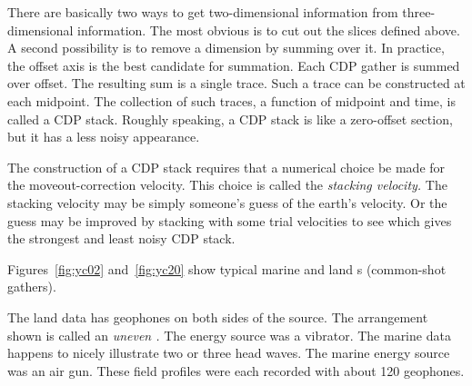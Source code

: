 \par
There are basically two ways to get two-dimensional information
from three-dimensional information.
The most obvious is to cut out the slices defined above.
A second possibility is to remove a dimension by summing over it.
In practice, the offset axis is the best candidate for summation.
Each CDP gather is summed over offset.
The resulting sum is a single trace.
Such a trace can be constructed at each midpoint.
The collection of such traces, a function of midpoint and time,
is called a CDP stack.
Roughly speaking, a CDP stack is like a zero-offset section,
but it has a less noisy appearance.
\par
The construction of a CDP stack requires that a numerical choice
be made for the moveout-correction velocity.
This choice is called the {\em stacking velocity.}
The stacking velocity may be simply someone's guess of the earth's velocity.
Or the guess may be improved by stacking with some trial velocities
to see which gives the strongest and least noisy CDP stack.
\par
Figures~\ref{fig:yc02} and~\ref{fig:yc20} show
typical marine and land s
(common-shot gathers).



The land data has geophones on both sides of the source.
The arrangement shown is called an
{\em uneven .}
The energy source was a vibrator.
The marine data happens to nicely illustrate
two or three head waves.
The marine energy source was an air gun.
These field profiles were each recorded with about 120 geophones.

